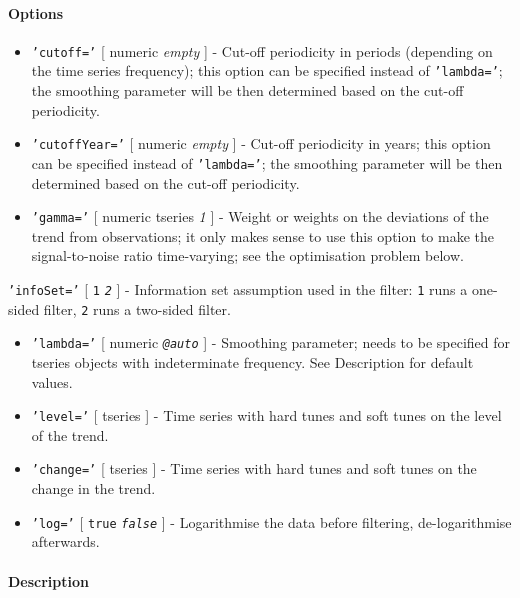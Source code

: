\paragraph{Options}

\begin{itemize}
\item
  \texttt{'cutoff='} {[} numeric \textbar{} \emph{empty} {]} - Cut-off
  periodicity in periods (depending on the time series frequency); this
  option can be specified instead of \texttt{'lambda='}; the smoothing
  parameter will be then determined based on the cut-off periodicity.
\item
  \texttt{'cutoffYear='} {[} numeric \textbar{} \emph{empty} {]} -
  Cut-off periodicity in years; this option can be specified instead of
  \texttt{'lambda='}; the smoothing parameter will be then determined
  based on the cut-off periodicity.
\item
  \texttt{'gamma='} {[} numeric \textbar{} tseries \textbar{} \emph{1}
  {]} - Weight or weights on the deviations of the trend from
  observations; it only makes sense to use this option to make the
  signal-to-noise ratio time-varying; see the optimisation problem
  below.
\end{itemize}

\texttt{'infoSet='} {[} \texttt{1} \textbar{} \emph{\texttt{2}} {]} -
Information set assumption used in the filter: \texttt{1} runs a
one-sided filter, \texttt{2} runs a two-sided filter.

\begin{itemize}
\item
  \texttt{'lambda='} {[} numeric \textbar{} \emph{\texttt{@auto}} {]} -
  Smoothing parameter; needs to be specified for tseries objects with
  indeterminate frequency. See Description for default values.
\item
  \texttt{'level='} {[} tseries {]} - Time series with hard tunes and
  soft tunes on the level of the trend.
\item
  \texttt{'change='} {[} tseries {]} - Time series with hard tunes and
  soft tunes on the change in the trend.
\item
  \texttt{'log='} {[} \texttt{true} \textbar{} \emph{\texttt{false}} {]}
  - Logarithmise the data before filtering, de-logarithmise afterwards.
\end{itemize}

\paragraph{Description}


